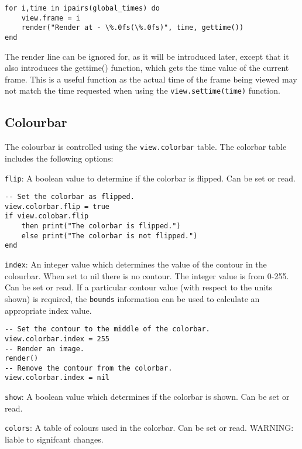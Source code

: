 \documentclass[11pt,twoside]{book}
\begin{document}
\begin{lstlisting}[style=lua]
for i,time in ipairs(global_times) do
    view.frame = i
    render("Render at - \%.0fs(\%.0fs)", time, gettime())
end
\end{lstlisting}

The render line can be ignored for, as it will be introduced later, except that
it also introduces the gettime() function, which gets the time value of the
current frame. This is a useful function as the actual time of the frame being
viewed may not match the time requested when using the
\lstinline{view.settime(time)} function.

\subsection{Colourbar}

The colourbar is controlled using the \lstinline{view.colorbar} table. The colorbar table includes the following options:

\lstinline{flip}: A boolean value to determine if the colorbar is flipped. Can be set or
read.

\begin{lstlisting}[style=lua]
-- Set the colorbar as flipped.
view.colorbar.flip = true
if view.colobar.flip
    then print("The colorbar is flipped.")
    else print("The colorbar is not flipped.")
end
\end{lstlisting}


\lstinline{index}: An integer value which determines the value of the contour in the
colourbar. When set to nil there is no contour. The integer value is from 0-255.
Can be set or read. If a particular contour value (with respect to the units
shown) is required, the \lstinline{bounds} information can be used to calculate
an appropriate index value.

\begin{lstlisting}[style=lua]
-- Set the contour to the middle of the colorbar.
view.colorbar.index = 255
-- Render an image.
render()
-- Remove the contour from the colorbar.
view.colorbar.index = nil
\end{lstlisting}

\lstinline{show}: A boolean value which determines if the colorbar is shown. Can be set or
read.

\lstinline{colors}: A table of colours used in the colorbar. Can be set or read. WARNING:
liable to signifcant changes.
\end{document}
